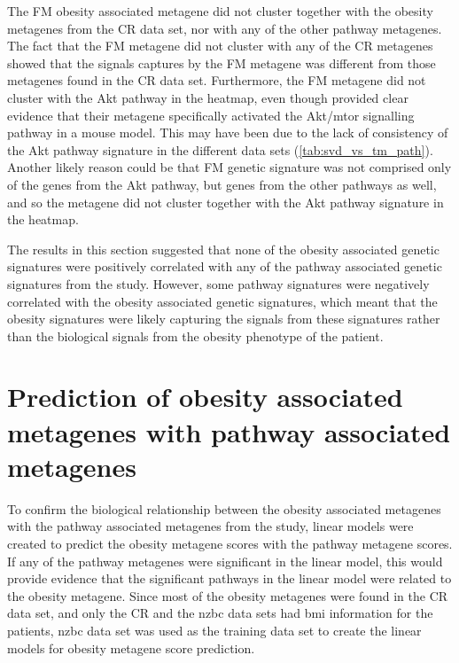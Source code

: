 The FM obesity associated metagene did not cluster together with the obesity metagenes from the CR data set, nor with any of the other pathway metagenes.
The fact that the FM metagene did not cluster with any of the CR metagenes showed that the signals captures by the FM metagene was different from those metagenes found in the CR data set.
Furthermore, the FM metagene did not cluster with the Akt pathway in the heatmap, even though \citet{Fuentes-Mattei2014} provided clear evidence that their metagene specifically activated the Akt/\gls{mtor} signalling pathway in a mouse model.
This may have been due to the lack of consistency of the Akt pathway signature in the different data sets (\cref{tab:svd_vs_tm_path}).
Another likely reason could be that FM genetic signature was not comprised only of the genes from the Akt pathway, but genes from the other pathways as well, and so the metagene did not cluster together with the Akt pathway signature in the heatmap.

The results in this section suggested that none of the obesity associated genetic signatures were positively correlated with any of the pathway associated genetic signatures from the \citet{Gatza2010a} study.
However, some pathway signatures were negatively correlated with the obesity associated genetic signatures, which meant that the obesity signatures were likely capturing the signals from these signatures  rather than the biological signals from the obesity phenotype of the patient.

\section{Prediction of obesity associated metagenes with pathway associated metagenes}
\label{sec:prediction_of_obesity_associated_metagene_with_pathway_associate_metagene}

To confirm the biological relationship between the obesity associated metagenes with the pathway associated metagenes from the \citet{Gatza2010a} study, linear models were created to predict the obesity metagene scores with the pathway metagene scores.
If any of the pathway metagenes were significant in the linear model, this would provide evidence that the significant pathways in the linear model were related to the obesity metagene.
Since most of the obesity metagenes were found in the CR data set, and only the CR and the \gls{nzbc} data sets had \gls{bmi} information for the patients, \gls{nzbc} data set was used as the training data set to create the linear models for obesity metagene score prediction.

